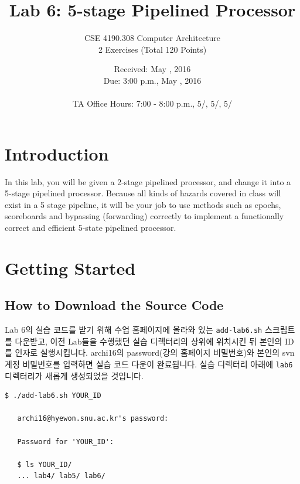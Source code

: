 \documentclass{article}
\begin{document}
\title{Lab 6: 5-stage Pipelined Processor}   %
\author{CSE 4190.308 Computer Architecture \\ 2 Exercises (Total 120 Points) }         
\date{Received: May , 2016 \\Due: 3:00 p.m., May , 2016\\ \ \\ TA Office Hours: 7:00 - 8:00 p.m., 5/, 5/, 5/}    %
\maketitle

\section{Introduction}

In this lab, you will be given a 2-stage pipelined processor,
and change it into a 5-stage pipelined processor.
Because all kinds of hazards covered in class will exist in a 5 stage
pipeline, it will be your job to use methods such as epochs, scoreboards and bypassing (forwarding)
correctly to implement a functionally correct
and efficient 5-state pipelined processor.


\section{Getting Started}
\subsection{How to Download the Source Code}
Lab 6의 실습 코드를 받기 위해 수업 홈페이지에 올라와 있는 \texttt{add-lab6.sh} 스크립트를 다운받고,
이전 Lab들을 수행했던 실습 디렉터리의 상위에 위치시킨 뒤 본인의 ID를 인자로 실행시킵니다.
archi16의 password(강의 홈페이지 비밀번호)와 본인의 svn 계정 비밀번호를 입력하면 실습 코드 다운이 완료됩니다.
실습 디렉터리 아래에 \texttt{lab6} 디렉터리가 새롭게 생성되었을 것입니다.

\begin{Verbatim}[frame=single]
   $ ./add-lab6.sh YOUR_ID

   archi16@hyewon.snu.ac.kr's password: 

   Password for 'YOUR_ID': 

   $ ls YOUR_ID/
   ... lab4/ lab5/ lab6/
\end{Verbatim}
\end{document}
